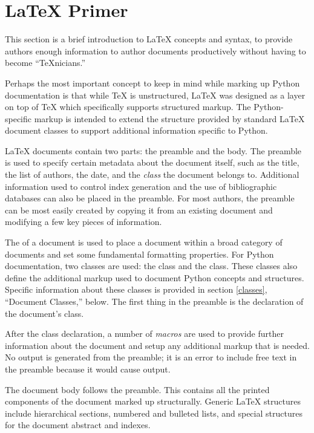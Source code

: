 \documentclass{howto}
\begin{document}
\section{\LaTeX{} Primer \label{latex-primer}}

  This section is a brief introduction to \LaTeX{} concepts and
  syntax, to provide authors enough information to author documents
  productively without having to become ``\TeX{}nicians.''

  Perhaps the most important concept to keep in mind while marking up
  Python documentation is that while \TeX{} is unstructured, \LaTeX{} was
  designed as a layer on top of \TeX{} which specifically supports 
  structured markup.  The Python-specific markup is intended to extend
  the structure provided by standard \LaTeX{} document classes to
  support additional information specific to Python.

  \LaTeX{} documents contain two parts: the preamble and the body.
  The preamble is used to specify certain metadata about the document
  itself, such as the title, the list of authors, the date, and the
  \emph{class} the document belongs to.  Additional information used
  to control index generation and the use of bibliographic databases
  can also be placed in the preamble.  For most authors, the preamble
  can be most easily created by copying it from an existing document
  and modifying a few key pieces of information.

  The  of a document is used to place a document within a
  broad category of documents and set some fundamental formatting
  properties.  For Python documentation, two classes are used: the
   class and the  class.  These classes also
  define the additional markup used to document Python concepts and
  structures.  Specific information about these classes is provided in
  section \ref{classes}, ``Document Classes,'' below.  The first thing
  in the preamble is the declaration of the document's class.

  After the class declaration, a number of \emph{macros} are used to
  provide further information about the document and setup any
  additional markup that is needed.  No output is generated from the
  preamble; it is an error to include free text in the preamble
  because it would cause output.

  The document body follows the preamble.  This contains all the
  printed components of the document marked up structurally.  Generic
  \LaTeX{} structures include hierarchical sections, numbered and
  bulleted lists, and special structures for the document abstract and
  indexes.
\end{document}
